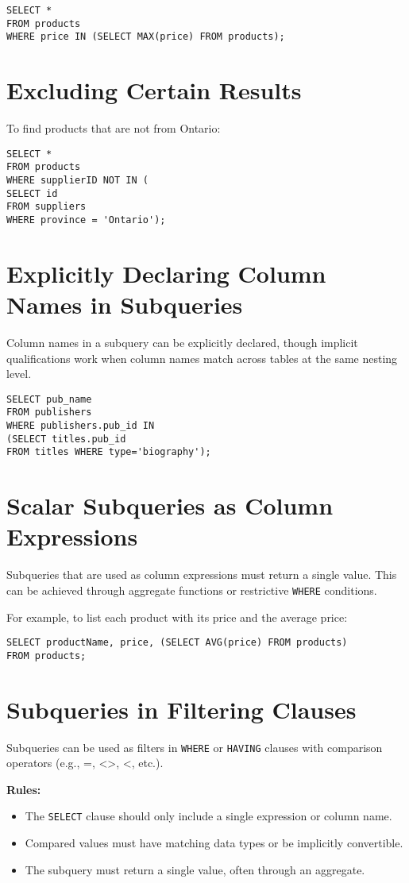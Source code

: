 \documentclass{article}
\begin{document}
\begin{verbatim}
SELECT * 
FROM products
WHERE price IN (SELECT MAX(price) FROM products);
\end{verbatim}

\section{Excluding Certain Results}
To find products that are not from Ontario:

\begin{verbatim}
SELECT * 
FROM products
WHERE supplierID NOT IN (
SELECT id 
FROM suppliers 
WHERE province = 'Ontario');
\end{verbatim}

\section{Explicitly Declaring Column Names in Subqueries}
Column names in a subquery can be explicitly declared, though implicit qualifications work when column names match across tables at the same nesting level.

\begin{verbatim}
SELECT pub_name
FROM publishers
WHERE publishers.pub_id IN 
(SELECT titles.pub_id
FROM titles WHERE type='biography');
\end{verbatim}

\section{Scalar Subqueries as Column Expressions}
Subqueries that are used as column expressions must return a single value. This can be achieved through aggregate functions or restrictive \texttt{WHERE} conditions.

For example, to list each product with its price and the average price:

\begin{verbatim}
SELECT productName, price, (SELECT AVG(price) FROM products)
FROM products;
\end{verbatim}

\section{Subqueries in Filtering Clauses}
Subqueries can be used as filters in \texttt{WHERE} or \texttt{HAVING} clauses with comparison operators (e.g., =, <>, <, etc.).

\textbf{Rules:}
\begin{itemize}
    \item The \texttt{SELECT} clause should only include a single expression or column name.
    \item Compared values must have matching data types or be implicitly convertible.
    \item The subquery must return a single value, often through an aggregate.
\end{itemize}
\end{document}
